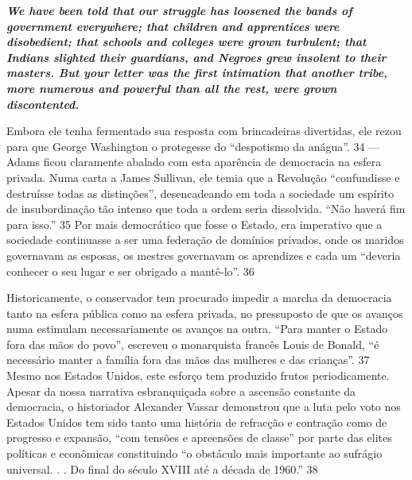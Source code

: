 \par
 

 \textbf{\textit{We have been told that our struggle has loosened the bands of government everywhere; that children and apprentices were disobedient; that schools and colleges were grown turbulent; that Indians slighted their guardians, and Negroes grew insolent to their masters. But your letter was the first intimation that another tribe, more numerous and powerful than all the rest, were grown discontented.} }  
 
 
\par
 
Embora ele tenha fermentado sua resposta com brincadeiras divertidas, ele rezou para que George Washington o protegesse do “despotismo da anágua”.
 {\color{blue} 34}  
— Adams ficou claramente abalado com esta aparência de democracia na esfera privada. Numa carta a James Sullivan, ele temia que a Revolução “confundisse e destruísse todas as distinções”, desencadeando em toda a sociedade um espírito de insubordinação tão intenso que toda a ordem seria dissolvida. “Não haverá fim para isso.”
 {\color{blue} 35}  
Por mais democrático que fosse o Estado, era imperativo que a sociedade continuasse a ser uma federação de domínios privados, onde os maridos governavam as esposas, os mestres governavam os aprendizes e cada um “deveria conhecer o seu lugar e ser obrigado a mantê-lo”.
 {\color{blue} 36}  

 
\par
 
Historicamente, o conservador tem procurado impedir a marcha da democracia tanto na esfera pública como na esfera privada, no pressuposto de que os avanços numa estimulam necessariamente os avanços na outra. “Para manter o Estado fora das mãos do povo”, escreveu o monarquista francês Louis de Bonald, “é necessário manter a família fora das mãos das mulheres e das crianças”.
 {\color{blue} 37}  
Mesmo nos Estados Unidos, este esforço tem produzido frutos periodicamente. Apesar da nossa narrativa esbranquiçada sobre a ascensão constante da democracia, o historiador Alexander Vassar demonstrou que a luta pelo voto nos Estados Unidos tem sido tanto uma história de refracção e contração como de progresso e expansão, “com tensões e apreensões de classe” por parte das elites políticas e econômicas constituindo “o obstáculo mais importante ao sufrágio universal. . . Do final do século XVIII até a década de 1960.”
 {\color{blue} 38}  

 
\par
 
